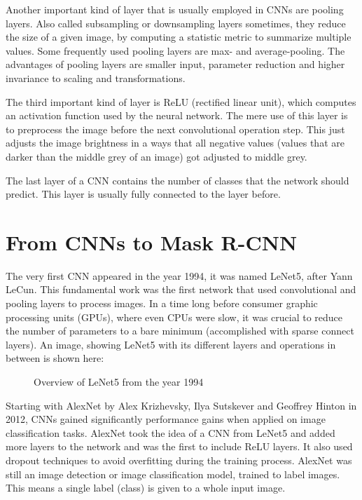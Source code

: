 Another important kind of layer that is usually employed in CNNs are pooling layers. Also called subsampling or downsampling layers sometimes, they reduce the size of a given image, by computing a statistic metric to summarize multiple values. Some frequently used pooling layers are max- and average-pooling. The advantages of pooling layers are smaller input, parameter reduction and higher invariance to scaling and transformations.

The third important kind of layer is ReLU (rectified linear unit), which computes an activation function used by the neural network. The mere use of this layer is to preprocess the image before the next convolutional operation step. This just adjusts the image brightness in a ways that all negative values (values that are darker than the middle grey of an image) got adjusted to middle grey.

The last layer of a CNN contains the number of classes that the network should predict. This layer is usually fully connected to the layer before.

\section{From CNNs to Mask R-CNN}

The very first CNN appeared in the year 1994, it was named LeNet5, after Yann LeCun. This fundamental work was the first network that used convolutional and pooling layers to process images. In a time long before consumer graphic processing units (GPUs), where even CPUs were slow, it was crucial to reduce the number of parameters to a bare minimum (accomplished with sparse connect layers). An image, showing LeNet5 with its different layers and operations in between is shown here:

\begin{figure}[H]
	\caption{\label{fig:lenet5} Overview of LeNet5 from the year 1994}
\end{figure}

Starting with AlexNet by Alex Krizhevsky, Ilya Sutskever and Geoffrey Hinton in 2012, CNNs gained significantly performance gains when applied on image classification tasks. AlexNet took the idea of a CNN from LeNet5 and added more layers to the network and was the first to include ReLU layers. It also used dropout techniques to avoid overfitting during the training process. AlexNet was still an image detection or image classification model, trained to label images. This means a single label (class) is given to a whole input image.

